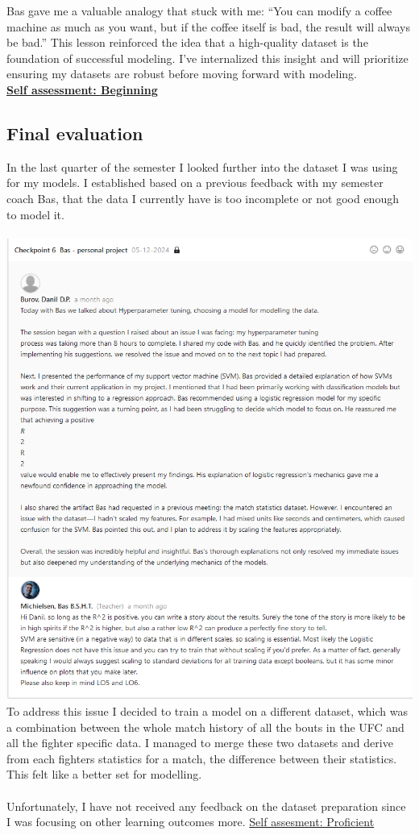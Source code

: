 \documentclass{article}
\begin{document}
	Bas gave me a valuable analogy that stuck with me: “You can modify a coffee machine as much as you want, but if the coffee itself is bad, the result will always be bad.” This lesson reinforced the idea that a high-quality dataset is the foundation of successful modeling. I’ve internalized this insight and will prioritize ensuring my datasets are robust before moving forward with modeling.\\
	  \underline{\textbf{Self assessment: Beginning}}
	\subsection{Final evaluation}
	In the last quarter of the semester I looked further into the dataset I was using for my models. I established based on a previous feedback with my semester coach Bas, that the data I currently have is too incomplete or not good enough to model it.\\\\
	\includegraphics[width=\textwidth]{images/Feedback_Bas_2.png}\\
	To address this issue I decided to train a model on a different dataset, which was a combination between the whole match history of all the bouts in the UFC and all the fighter specific data. I managed to merge these two datasets and derive from each fighters statistics for a match, the difference between their statistics. This felt like a better set for modelling.\\\\
	Unfortunately, I have not received any feedback on the dataset preparation since I was focusing on other learning outcomes more.
	\underline{Self assesment: Proficient}
	
\end{document}
